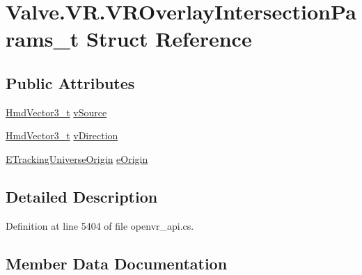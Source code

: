 \hypertarget{struct_valve_1_1_v_r_1_1_v_r_overlay_intersection_params__t}{}\section{Valve.\+V\+R.\+V\+R\+Overlay\+Intersection\+Params\+\_\+t Struct Reference}
\label{struct_valve_1_1_v_r_1_1_v_r_overlay_intersection_params__t}
\subsection*{Public Attributes}
\begin{DoxyCompactItemize}
\item 
\mbox{\hyperlink{struct_valve_1_1_v_r_1_1_hmd_vector3__t}{Hmd\+Vector3\+\_\+t}} \mbox{\hyperlink{struct_valve_1_1_v_r_1_1_v_r_overlay_intersection_params__t_ad2605f2aebb1ea1943cd88c73ce652d1}{v\+Source}}
\item 
\mbox{\hyperlink{struct_valve_1_1_v_r_1_1_hmd_vector3__t}{Hmd\+Vector3\+\_\+t}} \mbox{\hyperlink{struct_valve_1_1_v_r_1_1_v_r_overlay_intersection_params__t_a7ef143cb30ca995af07a4956a91091e9}{v\+Direction}}
\item 
\mbox{\hyperlink{namespace_valve_1_1_v_r_a29be99a3c2f780157bd490db06a7f12f}{E\+Tracking\+Universe\+Origin}} \mbox{\hyperlink{struct_valve_1_1_v_r_1_1_v_r_overlay_intersection_params__t_a58de3c7023719a7141441509b5cc06f9}{e\+Origin}}
\end{DoxyCompactItemize}


\subsection{Detailed Description}


Definition at line 5404 of file openvr\+\_\+api.\+cs.



\subsection{Member Data Documentation}
\mbox{\label{struct_valve_1_1_v_r_1_1_v_r_overlay_intersection_params__t_a58de3c7023719a7141441509b5cc06f9}} 
